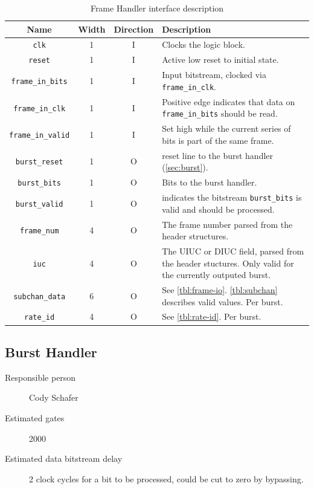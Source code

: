 \documentclass[dvips,10pt,twocolumn]{article}
\newcommand{\wire}{\texttt}
\begin{document}
\begin{table} \begin{tabularx}{\textwidth}{c|c|c|X} \label{tbl:frame-io}
	Name & Width & Direction & Description \\ \hline

	\wire{clk} & 1 & I & Clocks the logic block.\\

	\wire{reset} & 1 & I & Active low reset to initial state. \\

	\wire{frame\_in\_bits} & 1 & I & Input bitstream, clocked via
	\wire{frame\_in\_clk}. \\

	\wire{frame\_in\_clk} & 1 & I & Positive edge indicates that data on
	\wire{frame\_in\_bits} should be read. \\
	
	\wire{frame\_in\_valid} & 1 & I & Set high while the current series
	of bits is part of the same frame. \\

	\wire{burst\_reset} & 1 & O & reset line to the burst handler
	(\autoref{sec:burst}). \\

	\wire{burst\_bits} & 1 & O & Bits to the burst handler. \\

	\wire{burst\_valid} & 1 & O & indicates the bitstream
	\wire{burst\_bits} is valid and should be processed. \\


	\wire{frame\_num} & 4 & O & The frame number parsed from the header
	structures. \\

	\wire{iuc} & 4 & O & The UIUC or DIUC field, parsed from the header
	stuctures. Only valid for the currently outputed burst. \\

	\wire{subchan\_data} & 6 & O & See \autoref{tbl:frame-io}.
	\autoref{tbl:subchan} describes valid values. Per burst. \\

	\wire{rate\_id} & 4 & O & See \autoref{tbl:rate-id}. Per burst. \\

\end{tabularx} \caption{Frame Handler interface description} \end{table}


\subsection{Burst Handler} \label{sec:burst}
\begin{description}
	\item[Responsible person] Cody Schafer 
	\item[Estimated gates] 2000 
	\item[Estimated data bitstream delay] 2 clock cycles for a bit to be
		processed, could be cut to zero by bypassing.
\end{description}
\end{document}
